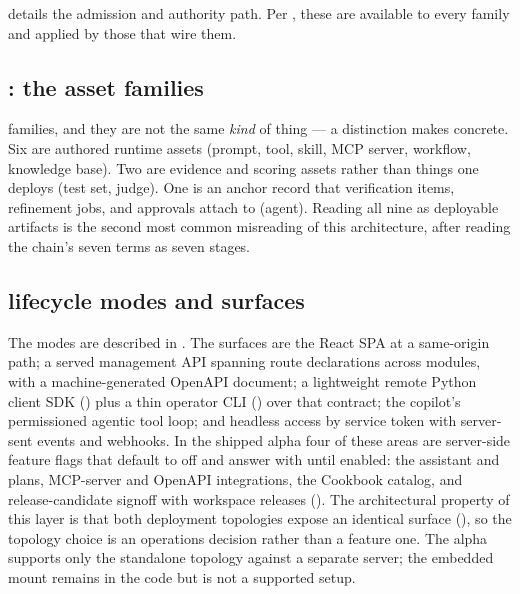 

\noindent{} details the admission and authority path. Per
, these are available to every family and applied by those
that wire them.

\subsection{: the asset families}

\statFamiliesC{} families, and they are not the same \emph{kind} of thing --- a
distinction  makes concrete. Six are authored runtime assets
(prompt, tool, skill, MCP server, workflow, knowledge base). Two are evidence and
scoring assets rather than things one deploys (test set, judge). One is an anchor
record that verification items, refinement jobs, and approvals attach to (agent).
Reading all nine as deployable artifacts is the second most common misreading of
this architecture, after reading the chain's seven terms as seven stages.

\subsection{ lifecycle modes and  surfaces}

The modes are described in . The surfaces are the React SPA
at a same-origin path; a served management API spanning \statRouteDecls{} route
declarations across \statRouteModules{} modules, with a machine-generated OpenAPI
document; a lightweight remote Python client SDK
() plus a thin operator CLI () over that
contract; the \aria{} copilot's permissioned agentic tool loop; and headless
access by service token with server-sent events and webhooks. In the shipped alpha
four of these areas are server-side feature flags that default to off and answer
 with  until enabled: the \aria{}
assistant and plans, MCP-server and OpenAPI integrations, the Cookbook catalog,
and release-candidate signoff with workspace releases
(). The architectural
property of this layer is that both deployment topologies expose an identical
surface (), so the topology choice is an operations
decision rather than a feature one. The alpha supports only the standalone
topology against a separate \mlflow{} server; the embedded mount remains in the code
but is not a supported setup.

